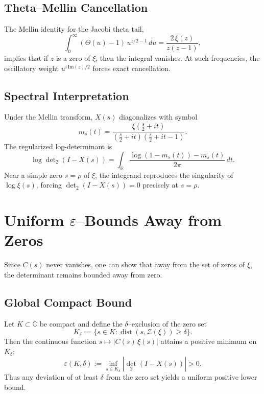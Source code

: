 \subsection{Theta--Mellin Cancellation}
The Mellin identity for the Jacobi theta tail,
\begin{equation}
\int_{0}^{\infty} (\Theta(u)-1) \, u^{z/2 - 1} \, du = \frac{2\, \xi(z)}{z(z-1)},
\end{equation}
implies that if $z$ is a zero of $\xi$, then the integral vanishes. At such frequencies, the oscillatory weight $u^{i\,\mathrm{Im}(z)/2}$ forces exact cancellation.

\subsection{Spectral Interpretation}
Under the Mellin transform, $X(s)$ diagonalizes with symbol
\begin{equation}
m_s(t) = \frac{\xi\left(\tfrac{s}{2}+it\right)}{\left(\tfrac{s}{2}+it\right)\left(\tfrac{s}{2}+it-1\right)}.
\end{equation}
The regularized log-determinant is
\begin{equation}
\log \det\nolimits_{2}(I - X(s)) = \int_{\mathbb{R}} \frac{\log(1-m_s(t)) - m_s(t)}{2\pi}\, dt.
\end{equation}
Near a simple zero $s=\rho$ of $\xi$, the integrand reproduces the singularity of $\log \xi(s)$, forcing $\det_2(I-X(s))=0$ precisely at $s=\rho$.

\section{Uniform $\varepsilon$--Bounds Away from Zeros}

Since $C(s)$ never vanishes, one can show that away from the set of zeros of $\xi$, the determinant remains bounded away from zero.

\subsection{Global Compact Bound}
Let $K\subset \mathbb{C}$ be compact and define the $\delta$--exclusion of the zero set
\begin{equation}
K_{\delta} := \{ s\in K : \operatorname{dist}(s, \mathcal{Z}(\xi)) \geq \delta \}.
\end{equation}
Then the continuous function $s \mapsto |C(s)\,\xi(s)|$ attains a positive minimum on $K_{\delta}$:
\begin{equation}
\varepsilon(K,\delta) := \inf_{s\in K_{\delta}} |\det_{2}(I - X(s))| > 0.
\end{equation}
Thus any deviation of at least $\delta$ from the zero set yields a uniform positive lower bound.

